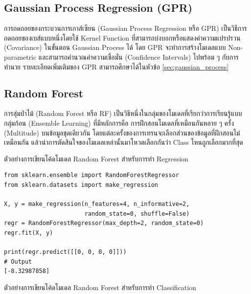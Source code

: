 \subsection{Gaussian Process Regression (GPR)}
\label{ssec:gpr}

การถดถอยของกระบวนการเกาส์เซียน (Gaussian Process Regression หรือ GPR) เป็นวิธีการถดถอยของเบส์แบบหนึ่งโดยใช้ Kernel Function
ที่สามารถบ่งบอกหรือแสดงค่าความแปรปรวน (Covariance) ในขั้นตอน Gaussian Process ได้\autocite{rasmussen2005} โดย GPR
จะทำการสร้างโมเดลแบบ Non-parametric และสามารถคำนวณค่าความเชื่อมั่น (Confidence Intervals) ไปพร้อม ๆ กับการทำนาย
รายละเอียดเพิ่มเติมของ GPR สามารถศึกษาได้ในหัวข้อ \ref{sec:gaussian_process}

\subsection{Random Forest}
\label{ssec:rs}

การสุ่มป่าไม้ (Random Forest หรือ RF) เป็นวิธีหนึ่งในกลุ่มของโมเดลที่เรียกว่าการเรียนรู้แบบกลุ่มก้อน (Ensemble Learning) ที่มีหลักการคือ%
การฝึกสอนโมเดลที่เหมือนกันหลาย ๆ ครั้ง (Multitude) บนข้อมูลชุดเดียวกัน โดยแต่ละครั้งของการเทรนจะเลือกส่วนของข้อมูลที่ฝึกสอนไม่เหมือนกัน
แล้วนำการตัดสินใจของโมเดลเหล่านั้นมาโหวตเลือกกันว่า Class ไหนถูกเลือกมากที่สุด\autocite{breiman2001,quinlan1986}

ตัวอย่างการเขียนโค้ดโมเดล Random Forest สำหรับการทำ Regression

\begin{lstlisting}[style=MyPython]
from sklearn.ensemble import RandomForestRegressor
from sklearn.datasets import make_regression

X, y = make_regression(n_features=4, n_informative=2,
                       random_state=0, shuffle=False)
regr = RandomForestRegressor(max_depth=2, random_state=0)
regr.fit(X, y)

print(regr.predict([[0, 0, 0, 0]]))
# Output
[-8.32987858]
\end{lstlisting}

\vspace{1em}

ตัวอย่างการเขียนโค้ดโมเดล Random Forest สำหรับการทำ Classification

